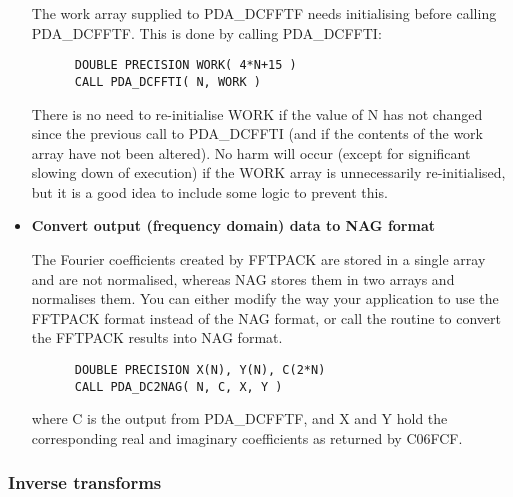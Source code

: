 \begin{itemize}
   The work array supplied to PDA\_DCFFTF needs initialising before calling
   PDA\_DCFFTF. This is done by calling PDA\_DCFFTI:

\begin{verbatim}
      DOUBLE PRECISION WORK( 4*N+15 )
      CALL PDA_DCFFTI( N, WORK )
\end{verbatim}

   There is no need to re-initialise WORK if the value of N has not
   changed since the previous call to PDA\_DCFFTI (and if the contents of the
   work array have not been altered). No harm will occur (except for
   significant slowing down of execution) if the WORK array is
   unnecessarily re-initialised, but it is a good idea to include some
   logic to prevent this.

\item{\bf Convert output (frequency domain) data to NAG format}

   The Fourier coefficients created by FFTPACK are stored in a single
   array and are not normalised, whereas NAG stores them in two arrays
   and normalises them. You can either modify the way your application
   to use the FFTPACK format instead of the NAG format, or call the
   routine to convert the FFTPACK results into NAG format. 

\begin{verbatim}
      DOUBLE PRECISION X(N), Y(N), C(2*N)
      CALL PDA_DC2NAG( N, C, X, Y )
\end{verbatim}

   where C is the output from PDA\_DCFFTF, and X and Y hold the corresponding 
   real and imaginary coefficients as returned by C06FCF.

   \end{itemize}


\subsubsection{Inverse transforms}

